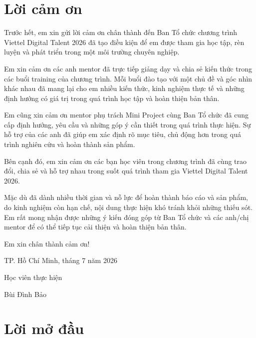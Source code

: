 \documentclass[11pt]{report}
\begin{document}
\maketitle


\chapter*{Lời cảm ơn}

Trước hết, em xin gửi lời cảm ơn chân thành đến Ban Tổ chức chương trình Viettel Digital Talent 2026 đã tạo điều kiện để em được tham gia học tập, rèn luyện và phát triển trong một môi trường chuyên nghiệp.

Em xin cảm ơn các anh mentor đã trực tiếp giảng dạy và chia sẻ kiến thức trong các buổi training của chương trình. Mỗi buổi đào tạo với một chủ đề và góc nhìn khác nhau đã mang lại cho em nhiều kiến thức, kinh nghiệm thực tế và những định hướng có giá trị trong quá trình học tập và hoàn thiện bản thân.

Em cũng xin cảm ơn mentor phụ trách Mini Project cùng Ban Tổ chức đã cung cấp định hướng, yêu cầu và những góp ý cần thiết trong quá trình thực hiện. Sự hỗ trợ của các anh đã giúp em xác định rõ mục tiêu, chủ động hơn trong quá trình nghiên cứu và hoàn thành sản phẩm.

Bên cạnh đó, em xin cảm ơn các bạn học viên trong chương trình đã cùng trao đổi, chia sẻ và hỗ trợ nhau trong suốt quá trình tham gia Viettel Digital Talent 2026.

Mặc dù đã dành nhiều thời gian và nỗ lực để hoàn thành báo cáo và sản phẩm, do kinh nghiệm còn hạn chế, nội dung thực hiện khó tránh khỏi những thiếu sót. Em rất mong nhận được những ý kiến đóng góp từ Ban Tổ chức và các anh/chị mentor để có thể tiếp tục cải thiện và hoàn thiện bản thân.

Em xin chân thành cảm ơn!

\hfill

\hfill TP. Hồ Chí Minh, tháng 7 năm 2026

\hfill Học viên thực hiện

\hfill Bùi Đình Bảo

\chapter*{Lời mở đầu}
\end{document}
